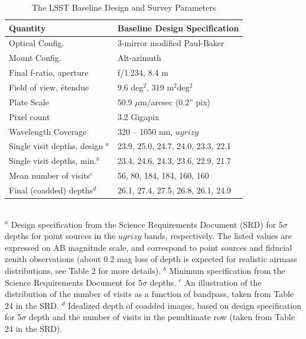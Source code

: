 \begin{table}
\caption{The LSST Baseline Design and Survey Parameters}
\begin{tabular}{|l|l|}
\hline
   Quantity                         &     Baseline Design Specification    \\
\hline
Optical Config.                           &  3-mirror modified Paul-Baker        \\
Mount Config.                            &  Alt-azimuth          \\
Final f-ratio, aperture                 &  f/1.234, 8.4 m                \\
Field of view, \'etendue              &  9.6 deg$^2$,   319 m$^2$deg$^2$     \\
Plate Scale                                  &  50.9 $\mu$m/arcsec (0.2'' pix)  \\
Pixel count                                  &  3.2 Gigapix  \\
Wavelength Coverage                   &  320 -- 1050 nm, $ugrizy$             \\
Single visit depths, design $^a$  &  23.9, 25.0, 24.7, 24.0, 23.3, 22.1    \\
Single visit depths, min.$^b$       &  23.4, 24.6, 24.3, 23.6, 22.9, 21.7    \\
Mean number of visits$^c$          &  56, 80, 184, 184, 160, 160               \\
Final (coadded) depths$^d$         &  26.1, 27.4, 27.5, 26.8, 26.1, 24.9     \\
\hline
\end{tabular}
\\ \vskip 0.05in
$^a$ Design specification from the Science Requirements Document (SRD) for 5$\sigma$ depths
for point sources in the $ugrizy$ bands, respectively. The listed values are expressed on AB magnitude
scale, and correspond to point sources and fiducial zenith observations (about 0.2 mag loss of depth
is expected for realistic airmass distributions, see Table 2 for more details).
$^b$ Minimum specification from the Science Requirements Document for 5$\sigma$ depths.
$^c$ An illustration of the distribution of the number of visits as a function of bandpass,
taken from Table 24 in the SRD.
$^d$ Idealized depth of coadded images, based on design specification for 5$\sigma$ depth and
the number of visits in the penultimate row (taken from Table 24 in the SRD).
\vskip 0.2in
\end{table}



